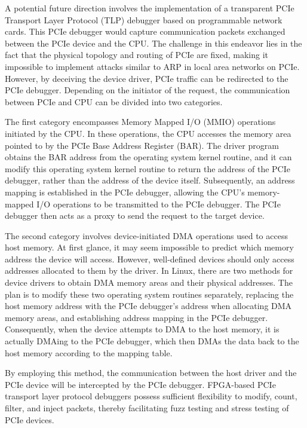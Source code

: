 A potential future direction involves the implementation of a transparent PCIe Transport Layer Protocol (TLP) debugger based on programmable network cards. This PCIe debugger would capture communication packets exchanged between the PCIe device and the CPU. The challenge in this endeavor lies in the fact that the physical topology and routing of PCIe are fixed, making it impossible to implement attacks similar to ARP in local area networks on PCIe. However, by deceiving the device driver, PCIe traffic can be redirected to the PCIe debugger. Depending on the initiator of the request, the communication between PCIe and CPU can be divided into two categories.

The first category encompasses Memory Mapped I/O (MMIO) operations initiated by the CPU. In these operations, the CPU accesses the memory area pointed to by the PCIe Base Address Register (BAR). The driver program obtains the BAR address from the operating system kernel routine, and it can modify this operating system kernel routine to return the address of the PCIe debugger, rather than the address of the device itself. Subsequently, an address mapping is established in the PCIe debugger, allowing the CPU's memory-mapped I/O operations to be transmitted to the PCIe debugger. The PCIe debugger then acts as a proxy to send the request to the target device.

The second category involves device-initiated DMA operations used to access host memory. At first glance, it may seem impossible to predict which memory address the device will access. However, well-defined devices should only access addresses allocated to them by the driver. In Linux, there are two methods for device drivers to obtain DMA memory areas and their physical addresses. The plan is to modify these two operating system routines separately, replacing the host memory address with the PCIe debugger's address when allocating DMA memory areas, and establishing address mapping in the PCIe debugger. Consequently, when the device attempts to DMA to the host memory, it is actually DMAing to the PCIe debugger, which then DMAs the data back to the host memory according to the mapping table.

By employing this method, the communication between the host driver and the PCIe device will be intercepted by the PCIe debugger. FPGA-based PCIe transport layer protocol debuggers possess sufficient flexibility to modify, count, filter, and inject packets, thereby facilitating fuzz testing and stress testing of PCIe devices.

